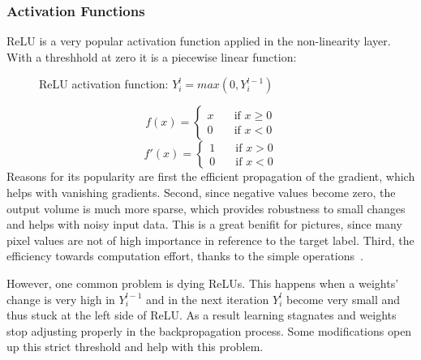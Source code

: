 \subsubsection{Activation Functions}
\gls{ReLU} is a very popular activation function applied in the non-linearity layer.
With a threshhold at zero it is a piecewise linear function:

\begin{figure}
\centering
\caption{\gls{ReLU} activation function: $Y_i^l=max(0,Y_i^{l-1})$} \label{fig:ReLU}

\end{figure}
\[ f(x) =
  \begin{cases}
    x       & \quad \text{if } x \geq 0\\
    0  & \quad \text{if } x < 0
  \end{cases}
\]
\[ f'(x) =
  \begin{cases}
    1       & \quad \text{if } x > 0\\
    0  & \quad \text{if } x < 0
  \end{cases}
\]
Reasons for its popularity are first the efficient propagation of the gradient, which helps with vanishing gradients.
Second, since negative values become zero, the output volume is much more sparse, which provides robustness to
small changes and helps with noisy input data.
This is a great benifit for pictures, since many pixel values are not of high importance in reference to
the target label.
Third, the efficiency towards computation effort, thanks to the simple operations~\cite{wikitumcnn, advanceddeeplearningpython}.

However, one common problem is dying \glspl{ReLU}.
This happens when a weights' change is very high in $Y_i^{l-1}$ and in the next iteration $Y_i^l$ become very small
and thus stuck at the left side of \gls{ReLU}.
As a result learning stagnates and weights
stop adjusting properly in the backpropagation process.
Some modifications open up this strict threshold and help with this problem.

